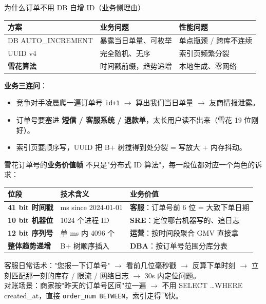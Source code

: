 \documentclass[aspectratio=169,11pt]{beamer}
\begin{document}
\begin{frame}[shrink]{为什么订单不用 DB 自增 ID（业务侧理由）}
\begin{tabular}{@{}lll@{}}
\toprule
方案 & 业务问题 & 性能问题 \\
\midrule
DB AUTO\_INCREMENT & 暴露当日单量、可枚举 & 单点瓶颈 / 跨库不连续 \\
UUID v4            & 完全随机、无序        & 索引页频繁分裂 \\
\textbf{雪花算法}  & 时间戳前缀，趋势递增  & 本地生成、零网络 \\
\bottomrule
\end{tabular}
\vspace{3mm}
\small \textbf{业务三连问}：
\begin{itemize}
  \item 竞争对手凌晨爬一遍订单号 \texttt{id+1} $\to$ 算出我们当日单量 $\to$ 友商情报泄露。
  \item 订单号要塞进 \textbf{短信 / 客服系统 / 退款单}，太长用户读不出来（雪花 19 位刚好）。
  \item 索引页要顺序写，UUID 把 B+ 树搅得到处分裂 = 写放大 + 内存抖动。
\end{itemize}
\end{frame}

\begin{frame}[shrink]{雪花订单号的\textbf{业务价值帧}}
不只是"分布式 ID 算法"，每一段位都对应一个角色的诉求：
\vspace{2mm}
\begin{tabular}{@{}lll@{}}
\toprule
位段 & 技术含义 & 业务价值 \\
\midrule
\textbf{41 bit 时间戳} & ms since 2024-01-01 & \textbf{客服}：订单号前 6 位 = 大致下单日期 \\
\textbf{10 bit 机器位} & 1024 个进程 ID      & \textbf{SRE}：定位哪台机器写的、追日志 \\
\textbf{12 bit 序列号} & 单 ms 内 4096 个    & \textbf{运营}：按时间段聚合 GMV 直接拿 \\
\textbf{整体趋势递增} & B+ 树顺序插入        & \textbf{DBA}：按订单号范围分库分表 \\
\bottomrule
\end{tabular}
\vspace{3mm}
\small 客服日常话术："您报一下订单号" $\to$ 看前几位毫秒戳 $\to$ 反算下单时刻 $\to$ 立刻匹配那一刻的库存 / 限流 / 网络日志 $\to$ 30s 内定位问题。\\
对账场景：商家按"昨天的订单号区间"拉一遍 $\to$ 不用 SELECT \dots WHERE created\_at，直接 \texttt{order\_num BETWEEN}，索引走得飞快。
\end{frame}
\end{document}
